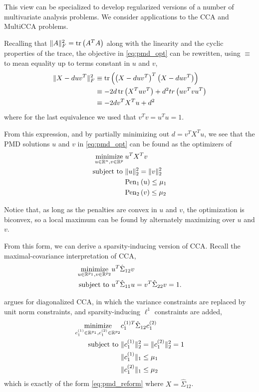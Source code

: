 \documentclass{article}
\begin{document}

This view can be specialized to develop regularized versions of a number of
multivariate analysis problems. We consider applications to the CCA and
MultiCCA problems.

Recalling that $\|A\|_{F}^{2} = \mathop\mathrm{tr}\left(A^{T}A\right)$ along with the linearity
and the cyclic properties of the trace, the objective in \ref{eq:pmd_opt} can be
rewritten, using $\equiv$ to mean equality up to terms constant in $u$ and $v$,
\begin{align*}
  \|X - duv^{T}\|_{F}^{2} &\equiv \mathop\mathrm{tr}\left(\left(X -
      duv^{T}\right)^{T}\left(X - duv^{T}\right)\right) \\
  &\equiv -2d\mathop\mathrm{tr}\left(X^{T}uv^{T}\right) + d^{2}tr\left(uv^{T}vu^{T}\right) \\
  &\equiv -2d v^{T}X^{T}u + d^{2}
\end{align*}
where for the last equivalence we used that $v^{T}v = u^{T}u = 1$.

From this expression, and by partially minimizing out $d = v^{T}X^{T}u$, we see
that the PMD solutions $u$ and $v$ in \ref{eq:pmd_opt} can be found as the
optimizers of
\begin{align}
\label{eq:pmd_reform}  \mathop\mathrm{minimize}_{u \in \mathbb{R}^{n}, v \in \mathbb{R}^{p}} \medspace &u^{T}X^{T}v \\
  \text{subject to } &\|u\|_{2}^{2} = \|v\|_{2}^{2} \nonumber \\
  &\text{Pen}_{1}\left(u\right) \leq \mu_{1}\nonumber \\
  &\text{Pen}_{2}\left(v\right) \leq \mu_{2} \nonumber
\end{align}

Notice that, as long as the penalties are convex in $u$ and $v$, the
optimization is biconvex, so a local maximum can be found by
alternately maximizing over $u$ and $v$.

From this form, we can derive a sparsity-inducing version of
CCA. Recall the maximal-covariance interpretation of CCA,
\begin{align*}
  \mathop\mathrm{minimize}_{u \in \mathbb{R}^{p_{1}}, v \in \mathbb{R}^{p_{2}}} &u^{T}\hat{\Sigma}_{12}v \\
  \text{subject to } &u^{T}\hat{\Sigma}_{11} u = v^{ T}\hat{\Sigma}_{22}v = 1.
\end{align*}

\citep{witten2009penalized} argues for diagonalized CCA, in which the variance
constraints are replaced by unit norm constraints, and sparsity-inducing
$\ell^{1}$ constraints are added,
\begin{align*}
  \mathop\mathrm{minimize}_{c_{1}^{(1)} \in \mathbb{R}^{p_{1}}, c_{1}^{(2)} \in
    \mathbb{R}^{p_{2}}} & c_{1}^{(1) T}\hat{\Sigma}_{12}
  c_{1}^{(2)} \\
  \text{subject to } &\|c_{1}^{(1)}\|_{2}^{2} = \|c_{1}^{(2)}\|_{2}^{2} = 1 \\
  &\|c_{1}^{(1)}\|_{1} \leq \mu_{1} \\
  &\|c_{1}^{(2)}\|_{1} \leq \mu_{2}
\end{align*}
which is exactly of the form \ref{eq:pmd_reform} where $X =
\hat{\Sigma}_{12}$.
\end{document}
